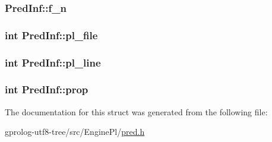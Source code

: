 \subsubsection[{\texorpdfstring{f\+\_\+n}{f_n}}]{ Pred\+Inf\+::f\+\_\+n}\hypertarget{structPredInf_ac0b2b557f702cda0d5111bc65630d5a3}{}\label{structPredInf_ac0b2b557f702cda0d5111bc65630d5a3}
\subsubsection[{\texorpdfstring{pl\+\_\+file}{pl_file}}]{\setlength{\rightskip}{0pt plus 5cm}int Pred\+Inf\+::pl\+\_\+file}\hypertarget{structPredInf_a0d5ac69f7fce6062b3327fc2badc1658}{}\label{structPredInf_a0d5ac69f7fce6062b3327fc2badc1658}
\subsubsection[{\texorpdfstring{pl\+\_\+line}{pl_line}}]{\setlength{\rightskip}{0pt plus 5cm}int Pred\+Inf\+::pl\+\_\+line}\hypertarget{structPredInf_a206ac901da36832f6111a542a2b8b11b}{}\label{structPredInf_a206ac901da36832f6111a542a2b8b11b}
\subsubsection[{\texorpdfstring{prop}{prop}}]{\setlength{\rightskip}{0pt plus 5cm}int Pred\+Inf\+::prop}\hypertarget{structPredInf_a2f0d287390fe634467a62f42f816d855}{}\label{structPredInf_a2f0d287390fe634467a62f42f816d855}


The documentation for this struct was generated from the following file\+:\begin{DoxyCompactItemize}
\item 
gprolog-\/utf8-\/tree/src/\+Engine\+Pl/\hyperlink{pred_8h}{pred.\+h}\end{DoxyCompactItemize}
